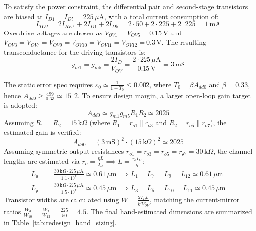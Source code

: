 To satisfy the power constraint, the differential pair and second-stage transistors are biased at $I_{D1}=I_{D5}=225\,\mu\mathrm{A}$, with a total current consumption of:
\begin{equation*}
I_{TOT} = 2I_{REF}+2I_{D1}+2I_{D5} = 2\cdot50 + 2\cdot225 + 2\cdot225 = 1\,\mathrm{mA}
\end{equation*}
Overdrive voltages are chosen as $V_{OV1}=V_{OV5}=0.15\,\mathrm{V}$ and $V_{OV3}=V_{OV7}=V_{OV9}=V_{OV10}=V_{OV11}=V_{OV12}=0.3\,\mathrm{V}$. The resulting transconductance for the driving transistors is:
\begin{equation*}
g_{m1}=g_{m5} = \frac{2I_D}{V_{OV}} = \frac{2\cdot225\,\mu\mathrm{A}}{0.15\,\mathrm{V}} = 3\,\mathrm{mS}
\end{equation*}

The static error spec requires $\varepsilon_0 \simeq \frac{1}{1+T_0} \leq 0.002$, where $T_0=\beta A_{dd0}$ and $\beta=0.33$, hence $A_{dd0} \geq \frac{499}{0.33} \simeq 1512$. To ensure design margin, a larger open-loop gain target is adopted:
\begin{equation*}
A_{dd0} \simeq g_{m1}g_{m5}R_1R_2 \simeq 2025
\end{equation*}
Assuming $R_1=R_2=15\,\mathrm{k}\Omega$ (where $R_1=r_{o1}\parallel r_{o3}$ and $R_2=r_{o5}\parallel r_{o7}$), the estimated gain is verified:
\begin{equation*}
A_{dd0} = (3\,\mathrm{mS})^2 \cdot (15\,\mathrm{k}\Omega)^2 \simeq 2025
\end{equation*}
Assuming symmetric output resistances $r_{o1}=r_{o3}=r_{o5}=r_{o7}=30\,\mathrm{k}\Omega$, the channel lengths are estimated via $r_o=\frac{\eta L}{I_D} \implies L=\frac{r_o I_D}{\eta}$:
\begin{align*}
L_n &= \frac{30\,\mathrm{k}\Omega\cdot225\,\mu\mathrm{A}}{1.1\cdot10^7} \simeq 0.61\,\mu\mathrm{m} \implies L_1=L_7=L_9=L_{12}\simeq0.61\,\mu\mathrm{m} \\
L_p &= \frac{30\,\mathrm{k}\Omega\cdot225\,\mu\mathrm{A}}{1.5\cdot10^7} \simeq 0.45\,\mu\mathrm{m} \implies L_3=L_5=L_{10}=L_{11}\simeq0.45\,\mu\mathrm{m}
\end{align*}
Transistor widths are calculated using $W = \frac{2I_D L}{k'V_{OV}^2}$, matching the current-mirror ratios $\frac{W_3}{W_{10}} = \frac{W_7}{W_{12}} = \frac{225}{50} = 4.5$. The final hand-estimated dimensions are summarized in Table~\ref{tab:redesign_hand_sizing}.

